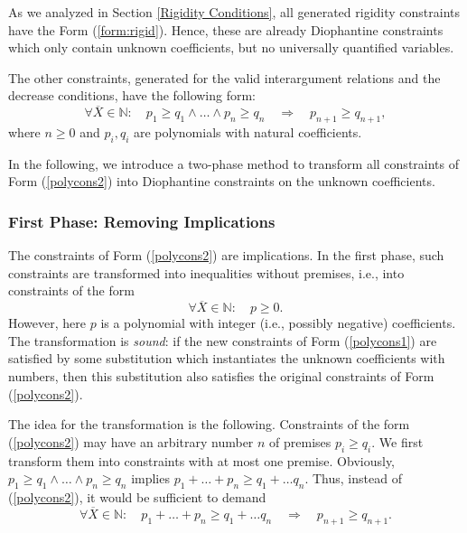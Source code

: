 \documentclass[envcountsame]{tlp}
\newcounter{polycons2ctr}
\newcounter{auxctr}
\newcounter{polycons1ctr}
\begin{document}
As we analyzed in Section \ref{Rigidity Conditions}, all generated rigidity
constraints have the Form (\ref{form:rigid}). Hence, these are already Diophantine
constraints which only contain unknown coefficients, but no universally
quantified variables. 

The other 
constraints, generated for the
valid interargument relations and the decrease conditions, have the following
form:
\setcounter{auxctr}{\value{equation}}
\setcounter{equation}{\value{polycons2ctr}}
 \begin{equation}
\forall \overline{X} \in \mathbb{N}: \quad p_1 \ge q_1 \wedge \ldots \wedge
p_n \ge q_n  \quad \Rightarrow  \quad p_{n+1} \ge q_{n+1},
\end{equation}
where $n \ge 0$ and $p_i, q_i$ are polynomials with natural
coefficients.
\setcounter{equation}{\value{auxctr}}

In the following, we introduce a two-phase method to transform
all constraints of Form (\ref{polycons2}) into
Diophantine constraints on the unknown coefficients. 


\subsubsection{First Phase: Removing Implications}\label{First Phase}\hspace*{\fill}

\vspace*{.2cm}

\noindent
The constraints of Form (\ref{polycons2}) are implications. In the first
phase, such constraints are transformed into inequalities without premises,
i.e., into constraints of the form
\setcounter{polycons1ctr}{\value{equation}}
 \begin{equation}
   \forall \overline{X} \in \mathbb{N}: \quad p \ge 0. \label{polycons1}
\end{equation}
However, here $p$ is a polynomial with integer (i.e., possibly negative)
coefficients. The transformation is \emph{sound}:
if the new constraints of Form
(\ref{polycons1}) are satisfied by some
substitution which instantiates the unknown coefficients with numbers, 
then this substitution also satisfies the
original constraints of Form (\ref{polycons2}).


The idea for the transformation is the following. Constraints
of the form (\ref{polycons2}) may have an arbitrary number $n$ of
premises $p_i \ge q_i$. We first transform them into
constraints with at most 
one premise. 
Obviously, $p_1 \ge q_1 \wedge \ldots \wedge
p_n \ge q_n$ implies $p_1 + \ldots + p_n \ge q_1 + \ldots q_n$. Thus, instead
of (\ref{polycons2}), it would be sufficient to demand
\[
   \forall \overline{X} \in \mathbb{N}: \quad p_1  + \ldots + p_n \ge q_1 + \ldots q_n
\quad \Rightarrow \quad p_{n+1} \ge q_{n+1}.
\]
\end{document}
